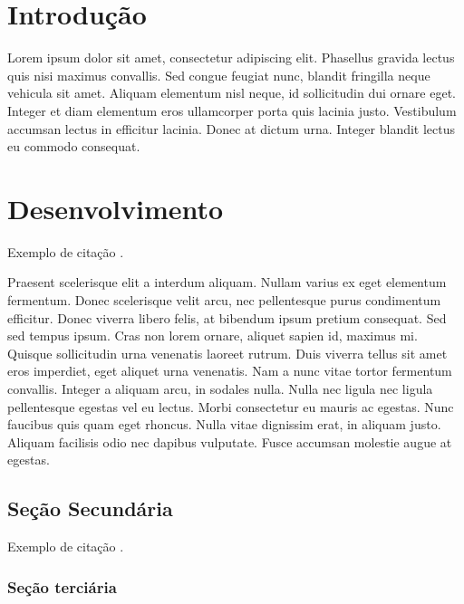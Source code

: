 \documentclass[
	12pt,				%
	openright,			%
	oneside,			%
	a4paper,			%
	chapter=TITLE,		%
	english,			%
	brazil,				%
	]{abntex2}
\begin{document}
\tableofcontents*
\cleardoublepage


\textual

\chapter{Introdução}

Lorem ipsum dolor sit amet, consectetur adipiscing elit. Phasellus gravida lectus quis nisi maximus convallis. Sed congue feugiat nunc, blandit fringilla neque vehicula sit amet. Aliquam elementum nisl neque, id sollicitudin dui ornare eget. Integer et diam elementum eros ullamcorper porta quis lacinia justo. Vestibulum accumsan lectus in efficitur lacinia. Donec at dictum urna. Integer blandit lectus eu commodo consequat.

\chapter{Desenvolvimento}

Exemplo de citação \cite{einstein}.

Praesent scelerisque elit a interdum aliquam. Nullam varius ex eget elementum fermentum. Donec scelerisque velit arcu, nec pellentesque purus condimentum efficitur. Donec viverra libero felis, at bibendum ipsum pretium consequat. Sed sed tempus ipsum. Cras non lorem ornare, aliquet sapien id, maximus mi. Quisque sollicitudin urna venenatis laoreet rutrum. Duis viverra tellus sit amet eros imperdiet, eget aliquet urna venenatis. Nam a nunc vitae tortor fermentum convallis. Integer a aliquam arcu, in sodales nulla. Nulla nec ligula nec ligula pellentesque egestas vel eu lectus. Morbi consectetur eu mauris ac egestas. Nunc faucibus quis quam eget rhoncus. Nulla vitae dignissim erat, in aliquam justo. Aliquam facilisis odio nec dapibus vulputate. Fusce accumsan molestie augue at egestas.

\section{Seção Secundária}

Exemplo de citação \cite{turing}.

\subsection{Seção terciária}
\end{document}
